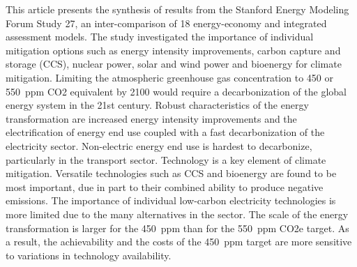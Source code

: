 This article presents the synthesis of results from the Stanford Energy Modeling Forum Study 27, an inter-comparison of 18 energy-economy and integrated assessment models. The study investigated the importance of individual mitigation options such as energy intensity improvements, carbon capture and storage (CCS), nuclear power, solar and wind power and bioenergy for climate mitigation. Limiting the atmospheric greenhouse gas concentration to 450 or 550 ppm CO2 equivalent by 2100 would require a decarbonization of the global energy system in the 21st century. Robust characteristics of the energy transformation are increased energy intensity improvements and the electrification of energy end use coupled with a fast decarbonization of the electricity sector. Non-electric energy end use is hardest to decarbonize, particularly in the transport sector. Technology is a key element of climate mitigation. Versatile technologies such as CCS and bioenergy are found to be most important, due in part to their combined ability to produce negative emissions. The importance of individual low-carbon electricity technologies is more limited due to the many alternatives in the sector. The scale of the energy transformation is larger for the 450 ppm than for the 550 ppm CO2e target. As a result, the achievability and the costs of the 450 ppm target are more sensitive to variations in technology availability.
